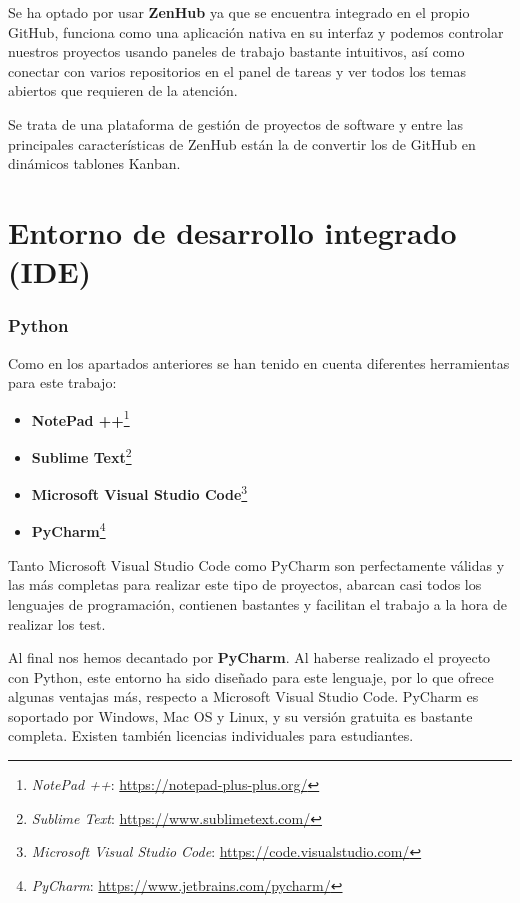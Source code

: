 Se ha optado por usar  \textbf {ZenHub} ya que se encuentra integrado en el propio GitHub, funciona como una aplicación nativa en su interfaz y podemos controlar nuestros proyectos usando paneles de trabajo bastante intuitivos, así como conectar con varios repositorios en el panel de tareas y ver todos los temas abiertos que requieren de la atención.

Se trata de una plataforma de gestión de proyectos de software y entre las principales características de ZenHub están la de convertir los  de GitHub en dinámicos tablones Kanban.

\section{Entorno de desarrollo integrado (IDE)}


\subsubsection{Python}

Como en los apartados anteriores se han tenido en cuenta diferentes herramientas para este trabajo:
\begin{itemize}
\item \textbf{NotePad ++}\footnote{\textsl{NotePad ++}: \url{https://notepad-plus-plus.org/}}
\item \textbf{Sublime Text}\footnote{\textsl{Sublime Text}: \url{https://www.sublimetext.com/}}
\item \textbf{Microsoft Visual Studio Code}\footnote{\textsl{Microsoft Visual Studio Code}: \url{https://code.visualstudio.com/}}
\item \textbf{PyCharm}\footnote{\textsl{PyCharm}: \url{https://www.jetbrains.com/pycharm/}}

\end{itemize}

Tanto Microsoft Visual Studio Code como PyCharm son perfectamente válidas y las más completas para realizar este tipo de proyectos, abarcan casi todos los lenguajes de programación, contienen bastantes  y facilitan el trabajo a la hora de realizar los test.

Al final nos hemos decantado por \textbf{PyCharm}. Al haberse realizado el proyecto con Python, este entorno ha sido diseñado para este lenguaje, por lo que ofrece algunas ventajas más, respecto a Microsoft Visual Studio Code. PyCharm es soportado por Windows, Mac OS y Linux, y su versión gratuita es bastante completa. Existen también licencias individuales para estudiantes.



